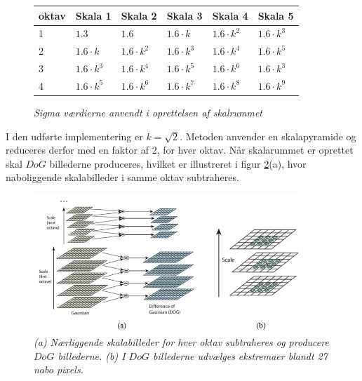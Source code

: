 \begin{figure}[H]
    \centering
    \begin{center}    
    \begin{tabular}{ | l | l | l | l | l | l | }
    \hline
    oktav & Skala 1 & Skala 2 & Skala 3 & Skala 4 & Skala 5 \\ \hline
    1 & $1.3$ & $1.6$ & $1.6 \cdot k$ & $1.6 \cdot k^2$ & $1.6 \cdot k^3$ \\ \hline
  	2 & $1.6 \cdot k$ & $1.6 \cdot k^2$ & $1.6 \cdot k^3$ & $1.6 \cdot k^4$ & $1.6 \cdot k^5$ \\ \hline
  	3 & $1.6 \cdot k^3$ & $1.6 \cdot k^4$ & $1.6 \cdot k^5$ & $1.6 \cdot k^6$ & $1.6 \cdot k^3$ \\ \hline
  	4 & $1.6 \cdot k^5$ & $1.6 \cdot k^6$ & $1.6 \cdot k^7$ & $1.6 \cdot k^8$ & $1.6 \cdot k^9$ \\ \hline
    \end{tabular}       
    \caption{{\footnotesize \textit{Sigma værdierne anvendt i oprettelsen af skalrummet}}}
    \label{fig:secderivfiltersize}
     \end{center}
     \vspace{-2.5em}
  \end{figure} \noindent
I den udførte implementering er $k=\sqrt{2}$.  Metoden anvender en skalapyramide og reduceres derfor med en faktor af 2, for hver oktav. Når skalarummet er oprettet skal $DoG$ billederne produceres, hvilket er illustreret i figur \ref{fig:difference}(a), hvor naboliggende skalabilleder i samme oktav subtraheres. 
\begin{figure}[H]
    \centering
    \includegraphics[width=0.90\textwidth]{fig/30.png}
     \vspace{-1em}
    \begin{center}    
       \caption{{\footnotesize \textit{(a) Nærliggende skalabilleder for hver oktav subtraheres og producere $DoG$ billederne. (b) I  $DoG$ billederne udvælges ekstremaer blandt 27 nabo pixels.}}}
    \label{fig:difference}
     \end{center}
     \vspace{-2.5em}
  \end{figure} \noindent    

